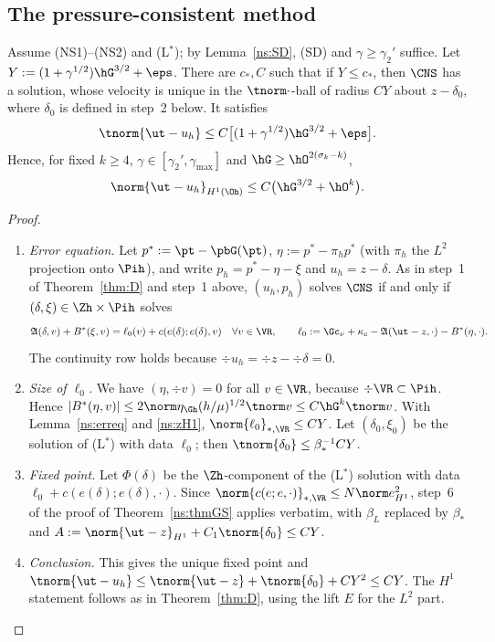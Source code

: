 \subsection{The pressure-consistent method}

\begin{theorem}\label{ns:thmD}
Assume (NS1)--(NS2) and (L$^\ast$); by Lemma~\ref{ns:SD}, (SD) and $\gamma\ge\gamma_2'$ suffice. Let $Y:=(1+\gamma^{1/2})\hG^{3/2}+\eps$. There are $c_\ast,C$ such that if $Y\le c_\ast$, then $\CNS$ has a solution, whose velocity is unique in the $\tnorm\cdot$-ball of radius $CY$ about $z-\delta_0$, where $\delta_0$ is defined in step~2 below. It satisfies
\[
\tnorm{\ut-u_h}\le C\bigl[(1+\gamma^{1/2})\hG^{3/2}+\eps\bigr].
\]
Hence, for fixed $k\ge4$, $\gamma\in[\gamma_2',\gamma_{\max}]$ and $\hG\ge\hO^{2(\sigma_k-k)}$,
\[
\norm{\ut-u_h}_{H^1(\Oh)}\le C\bigl(\hG^{3/2}+\hO^k\bigr).
\]
\end{theorem}

\begin{proof}
\begin{enumerate}
\item \emph{Error equation.} Let $p^\ast:=\pt-\pbG(\pt)$, $\eta:=p^\ast-\pi_hp^\ast$ (with $\pi_h$ the $L^2$ projection onto $\Pih$), and write $p_h=p^\ast-\eta-\xi$ and $u_h=z-\delta$. As in step~1 of Theorem~\ref{thm:D} and step~1 above, $(u_h,p_h)$ solves $\CNS$ if and only if $(\delta,\xi)\in\Zh\times\Pih$ solves
\[
\Aop(\delta,v)+B^\ast(\xi,v)=\ell_0(v)+c(e(\delta);e(\delta),v)\quad\forall v\in\VR,
\qquad \ell_0:=\Gc_\nu+\kappa_c-\Aop(\ut-z,\cdot)-B^\ast(\eta,\cdot).
\]
The continuity row holds because $\div u_h=\div z-\div\delta=0$.
\item \emph{Size of $\ell_0$.} We have $(\eta,\div v)=0$ for all $v\in\VR$, because $\div\VR\subset\Pih$. Hence $|B^\ast(\eta,v)|\le2\norm\eta_{\Gh}(h/\mu)^{1/2}\tnorm v\le C\hG^k\tnorm v$. With Lemma~\ref{ns:erreq} and \eqref{ns:zH1}, $\norm{\ell_0}_{\ast,\VR}\le CY$. Let $(\delta_0,\xi_0)$ be the solution of (L$^\ast$) with data $\ell_0$; then $\tnorm{\delta_0}\le\beta_\ast^{-1}CY$.
\item \emph{Fixed point.} Let $\Phi(\delta)$ be the $\Zh$-component of the (L$^\ast$) solution with data $\ell_0+c(e(\delta);e(\delta),\cdot)$. Since $\norm{c(e;e,\cdot)}_{\ast,\VR}\le N\norm e_{H^1}^2$, step~6 of the proof of Theorem~\ref{ns:thmGS} applies verbatim, with $\beta_L$ replaced by $\beta_\ast$ and $A:=\norm{\ut-z}_{H^1}+C_1\tnorm{\delta_0}\le CY$.
\item \emph{Conclusion.} This gives the unique fixed point and $\tnorm{\ut-u_h}\le\tnorm{\ut-z}+\tnorm{\delta_0}+CY^2\le CY$. The $H^1$ statement follows as in Theorem~\ref{thm:D}, using the lift $E$ for the $L^2$ part.\qedhere
\end{enumerate}
\end{proof}

